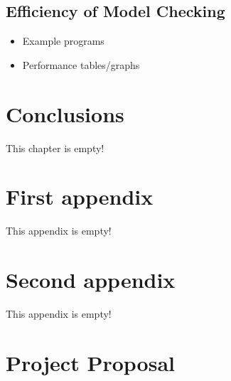 \documentclass[12pt,a4paper,twoside,openright]{report}
\begin{document}
\section{Efficiency of Model Checking}

\begin{itemize}
	\item Example programs
	\item Performance tables/graphs
\end{itemize}

\chapter{Conclusions}

This chapter is empty!




\appendix

\chapter{First appendix}
 
 This appendix is empty!
 
\chapter{Second appendix}

This appendix is empty!

\chapter{Project Proposal}


\end{document}

